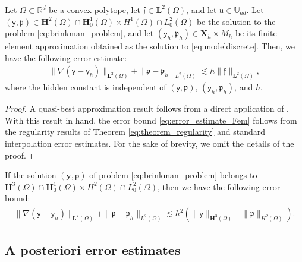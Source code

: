 \documentclass[final]{siamart0216}
\begin{document}
\begin{theorem}\label{eq:theorem_error_estimates}
Let $\Omega\subset \mathbb{R}^d$ be a convex polytope, let $\boldsymbol{\mathfrak{f}}\in\mathbf{L}^2(\Omega)$, and let $\mathfrak{u}\in \mathbb{U}_{ad}$. Let $(\boldsymbol{\mathsf{y}},\mathfrak{p})\in\mathbf{H}^2(\Omega)\cap\mathbf{H}_0^1(\Omega) \times H^1(\Omega)\cap L_0^2(\Omega)$ be the solution to the problem \eqref{eq:brinkman_problem}, and let $(\boldsymbol{\mathsf{y}}_{h},\mathfrak{p}_{h})\in\mathbf{X}_h\times  M_h$ be its finite element approximation obtained as the solution to \eqref{eq:modeldiscrete}. Then, we have the following error estimate:
\begin{align}\label{eq:error_estimate_Fem}
\|\nabla(\boldsymbol{\mathsf{y}}-\boldsymbol{\mathsf{y}}_{h})\|_{\mathbf{L}^2(\Omega)}+\|\mathfrak{p}-\mathfrak{p}_{h}\|_{L^2(\Omega)}
\lesssim 
h
\|\boldsymbol{\mathfrak{f}}\|_{\mathbf{L}^2(\Omega)},
\end{align}
where the hidden constant is independent of $(\boldsymbol{\mathsf{y}},\mathfrak{p})$, $(\boldsymbol{\mathsf{y}}_{h},\mathfrak{p}_{h})$, and $h$.
\end{theorem}
\begin{proof}
A quasi-best approximation result follows from a direct application of \cite[Lemma 2.44]{Guermond-Ern}. With this result in hand, the error bound \eqref{eq:error_estimate_Fem} follows from the regularity results of Theorem \ref{eq:theorem_regularity} and standard interpolation error estimates. For the sake of brevity, we omit the details of the proof.
\end{proof}

\begin{remark}
If the solution $(\mathbf{y},\mathsf{p})$ of problem \eqref{eq:brinkman_problem} belongs to $\mathbf{H}^3(\Omega) \cap\mathbf{H}_0^1(\Omega)\times H^2(\Omega)\cap L_0^2(\Omega)$, then we have the following error bound:
\begin{align*}
\|\nabla(\boldsymbol{\mathsf{y}}-\boldsymbol{\mathsf{y}}_{h})\|_{\mathbf{L}^2(\Omega)}+\|\mathfrak{p}-\mathfrak{p}_{h}\|_{L^2(\Omega)}
\lesssim 
h^2 \left( \|\boldsymbol{\mathsf{y}}\|_{\mathbf{H}^3(\Omega)} + \|\mathfrak{p}\|_{H^2(\Omega)} \right).
\end{align*}
\end{remark}

\subsection{A posteriori error estimates}
\end{document}
